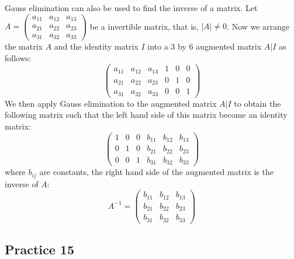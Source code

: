 \documentclass{report}
\begin{document}
\begin{multicols}{2}
    Gauss elimination can also be used to find the inverse of a matrix.
    Let $A = \begin{pmatrix} a_{11} & a_{12} & a_{13} \\ a_{21} & a_{22} & a_{23} \\ a_{31} & a_{32} & a_{33} \end{pmatrix}$ be a invertible matrix, that is, $|A| \neq 0$. Now we arrange the matrix $A$ and the identity matrix $I$ into a 3 by 6 augmented matrix $A|I$ as follows:
    \[
        \left(\begin{array}{ccc|ccc}
                a_{11} & a_{12} & a_{13} & 1 & 0 & 0 \\
                a_{21} & a_{22} & a_{23} & 0 & 1 & 0 \\
                a_{31} & a_{32} & a_{33} & 0 & 0 & 1
            \end{array}\right)
    \]
    We then apply Gauss elimination to the augmented matrix $A|I$ to obtain the
    following matrix such that the left hand side of this matrix become an identity
    matrix:
    \[
        \left(\begin{array}{ccc|ccc}
                1 & 0 & 0 & b_{11} & b_{12} & b_{13} \\
                0 & 1 & 0 & b_{21} & b_{22} & b_{23} \\
                0 & 0 & 1 & b_{31} & b_{32} & b_{33}
            \end{array}\right)
    \]
    where $b_{ij}$ are constants, the right hand side of the augmented matrix is
    the inverse of $A$:
    \[
        A^{-1} = \begin{pmatrix} b_{11} & b_{12} & b_{13} \\ b_{21} & b_{22} & b_{23} \\ b_{31} & b_{32} & b_{33} \end{pmatrix}
    \]

    \subsection{Practice 15}


\end{multicols}
\end{document}
